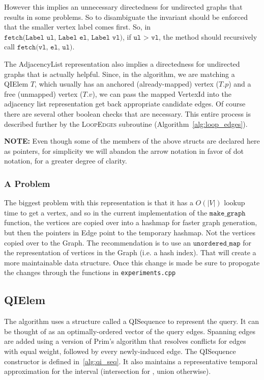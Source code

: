 However this implies an unnecessary directedness for undirected graphs that
results in some problems. So to disambiguate the invariant should be enforced
that the smaller vertex label comes first. So, in $\texttt{fetch(Label ul, Label
  el, Label vl)}$, if $\texttt{ul > vl}$, the method should recursively call
$\texttt{fetch(vl, el, ul)}$.


The AdjacencyList representation also implies a directedness for undirected
graphs that is actually helpful. Since, in the algorithm, we are matching a
QIElem $T$, which usually has an anchored (already-mapped) vertex ($T.p$) and a
free (unmapped) vertex ($T.v$), we can pass the mapped VertexId into the
adjacency list representation get back appropriate candidate edges. Of course
there are several other boolean checks that are necessary. This entire process
is described further by the \textsc{LoopEdges} subroutine
(Algorithm~\ref{alg:loop_edges}).


\textbf{NOTE:} Even though some of the members of the above structs
are declared here as pointers, for simplicity we will abandon the
arrow notation in favor of dot notation, for a greater degree of clarity.


\subsubsection{A Problem}
The biggest problem with this representation is that it has a $O(|V|)$ lookup
time to get a vertex, and so in the current implementation of the
$\texttt{make\_graph}$ function, the vertices are copied over into a hashmap for
faster graph generation, but then the pointers in Edge point to the temporary
hashmap. Not the vertices copied over to the Graph. The recommendation is to use
an $\texttt{unordered\_map}$ for the representation of vertices in the Graph
(i.e. a hash index). That will create a more maintainable data structure. Once
this change is made be sure to propogate the changes through the functions in
\texttt{experiments.cpp}


\subsection{QIElem}

The algorithm uses a structure called a QISequence to represent the query. It
can be thought of as an optimally-ordered vector of the query edges. Spanning
edges are added using a version of Prim's algorithm that resolves conflicts for
edges with equal weight, followed by every newly-induced edge. The QISequence
constructor is defined in~\ref{alg:qi_seq}. It also maintains a representative
temporal approximation for the interval (intersection for \concur, union
otherwise).

